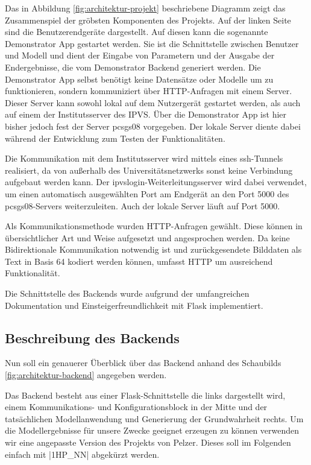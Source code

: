 \documentclass[a4paper]{extarticle}
\begin{document}
    Das in Abbildung \ref{fig:architektur-projekt} beschriebene Diagramm zeigt das Zusammenspiel der gröbsten Komponenten des Projekts.
    Auf der linken Seite sind die Benutzerendgeräte dargestellt. 
    Auf diesen kann die sogenannte Demonstrator App gestartet werden.
    Sie ist die Schnittstelle zwischen Benutzer und Modell und dient der Eingabe von Parametern und der Ausgabe der Endergebnisse, 
    die vom Demonstrator Backend generiert werden. 
    Die Demonstrator App selbst benötigt keine Datensätze oder Modelle um zu funktionieren, sondern kommuniziert über HTTP-Anfragen mit einem Server.
    Dieser Server kann sowohl lokal auf dem Nutzergerät gestartet werden, als auch auf einem der Institutsserver des IPVS.
    Über die Demonstrator App ist hier bisher jedoch fest der Server \glqq{}pcsgs08\grqq{} vorgegeben.
    Der lokale Server diente dabei während der Entwicklung zum Testen der Funktionalitäten. 

    Die Kommunikation mit dem Institutsserver wird mittels eines ssh-Tunnels realisiert, 
    da von außerhalb des Universitätsnetzwerks sonst keine Verbindung aufgebaut werden kann.
    Der ipvslogin-Weiterleitungsserver wird dabei verwendet, 
    um einen automatisch ausgewählten Port am Endgerät an den Port 5000 des pcsgs08-Servers weiterzuleiten.
    Auch der lokale Server läuft auf Port 5000.

    Als Kommunikationsmethode wurden HTTP-Anfragen gewählt. 
    Diese können in übersichtlicher Art und Weise aufgesetzt und angesprochen werden.
    Da keine Bidirektionale Kommunikation notwendig ist und zurückgesendete Bilddaten als Text in Basis 64 kodiert werden können,
    umfasst HTTP um ausreichend Funktionalität.

    Die Schnittstelle des Backends wurde aufgrund der umfangreichen Dokumentation und Einsteigerfreundlichkeit mit Flask implementiert.
    
    \subsection{Beschreibung des Backends}

    Nun soll ein genauerer Überblick über das Backend anhand des Schaubilds \ref{fig:architektur-backend} angegeben werden.
  
    Das Backend besteht aus einer Flask-Schnittstelle die links dargestellt wird, einem Kommunikations- und Konfigurationsblock in der Mitte
    und der tatsächlichen Modellanwendung und Generierung der Grundwahrheit rechts.
    Um die Modellergebnisse für unsere Zwecke geeignet erzeugen zu können verwenden wir eine angepasste Version des Projekts von Pelzer.
    Dieses soll im Folgenden einfach mit |1HP_NN| abgekürzt werden.
\end{document}
